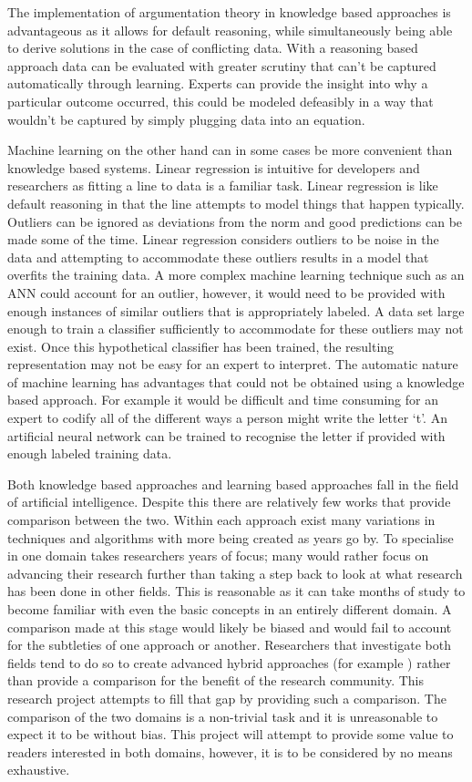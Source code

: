 The implementation of argumentation theory in knowledge based approaches is advantageous as it allows for default reasoning, while simultaneously being able to derive solutions in the case of conflicting data. With a reasoning based approach data can be evaluated with greater scrutiny that can't be captured automatically through learning. Experts can provide the insight into why a particular outcome occurred, this could be modeled defeasibly in a way that wouldn't be captured by simply plugging data into an equation.

Machine learning on the other hand can in some cases be more convenient than knowledge based systems. Linear regression is intuitive for developers and researchers as fitting a line to data is a familiar task. Linear regression is like default reasoning in that the line attempts to model things that happen typically. Outliers can be ignored as deviations from the norm and good predictions can be made some of the time. Linear regression considers outliers to be noise in the data and attempting to accommodate these outliers results in a model that overfits the training data. A more complex machine learning technique such as an ANN could account for an outlier, however, it would need to be provided with enough instances of similar outliers that is appropriately labeled. A data set large enough to train a classifier sufficiently to accommodate for these outliers may not exist. Once this hypothetical classifier has been trained, the resulting representation may not be easy for an expert to interpret. The automatic nature of machine learning has advantages that could not be obtained using a knowledge based approach. For example it would be difficult and time consuming for an expert to codify all of the different ways a person might write the letter `t'. An artificial neural network can be trained to recognise the letter if provided with enough labeled training data.

Both knowledge based approaches and learning based approaches fall in the field of artificial intelligence. Despite this there are relatively few works that provide comparison between the two. Within each approach exist many variations in techniques and algorithms with more being created as years go by. To specialise in one domain takes researchers years of focus; many would rather focus on advancing their research further than taking a step back to look at what research has been done in other fields. This is reasonable as it can take months of study to become familiar with even the basic concepts in an entirely different domain. A comparison made at this stage would likely be biased and would fail to account for the subtleties of one approach or another. Researchers that investigate both fields tend to do so to create advanced hybrid approaches (for example \cite{gomez2004hybrid}) rather than provide a comparison for the benefit of the research community. This research project attempts to fill that gap by providing such a comparison. The comparison of the two domains is a non-trivial task and it is unreasonable to expect it to be without bias. This project will attempt to provide some value to readers interested in both domains, however, it is to be considered by no means exhaustive.

